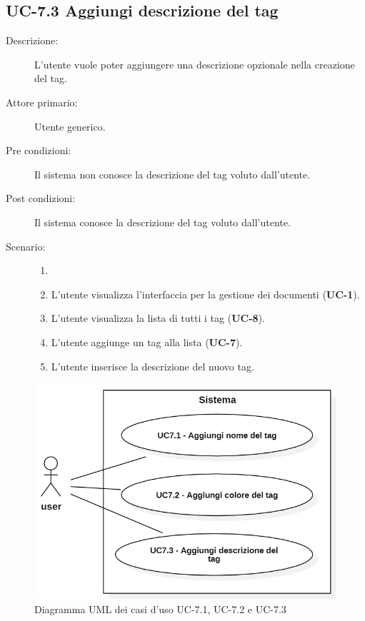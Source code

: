 \subsection{UC-7.3 Aggiungi descrizione del tag}
\begin{description}
    \item[Descrizione:] L’utente vuole poter aggiungere una descrizione opzionale nella creazione del tag.
    \item[Attore primario:] Utente generico.
    \item[Pre condizioni:] Il sistema non conosce la descrizione  del tag voluto dall’utente.
    \item[Post condizioni:] Il sistema conosce la descrizione del tag voluto dall’utente.
    \item[Scenario:]
    \begin{enumerate}
        \item[] 
        \item L’utente visualizza l'interfaccia per la gestione dei documenti (\textbf{UC-1}).
        \item L’utente visualizza la lista di tutti i tag (\textbf{UC-8}).
        \item L'utente aggiunge un tag alla lista (\textbf{UC-7}).
        \item L'utente inserisce la descrizione del nuovo tag.
    \end{enumerate}
\end{description}
\begin{figure}[H]
    \centering
    \includegraphics[width=0.8\linewidth]{UC7.1-2-3.PNG}
    \caption{Diagramma UML dei casi d'uso UC-7.1, UC-7.2 e UC-7.3}
    \label{fig:UC7.1-2-3}
\end{figure}

